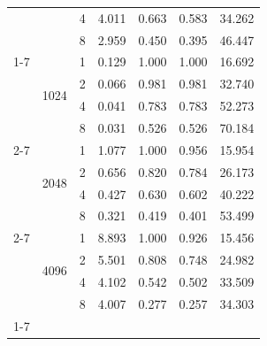 \begin{table}[H]
\begin{tabular}{lllllll}
 &  & 4 & 4.011 & 0.663 & 0.583 & 34.262 \\
 &  & 8 & 2.959 & 0.450 & 0.395 & 46.447 \\
\cline{1-7} \cline{2-7}
\multirow[t]{12}{*}{Alg. 3 Numba (prange)} & \multirow[t]{4}{*}{1024} & 1 & 0.129 & 1.000 & 1.000 & 16.692 \\
 &  & 2 & 0.066 & 0.981 & 0.981 & 32.740 \\
 &  & 4 & 0.041 & 0.783 & 0.783 & 52.273 \\
 &  & 8 & 0.031 & 0.526 & 0.526 & 70.184 \\
\cline{2-7}
 & \multirow[t]{4}{*}{2048} & 1 & 1.077 & 1.000 & 0.956 & 15.954 \\
 &  & 2 & 0.656 & 0.820 & 0.784 & 26.173 \\
 &  & 4 & 0.427 & 0.630 & 0.602 & 40.222 \\
 &  & 8 & 0.321 & 0.419 & 0.401 & 53.499 \\
\cline{2-7}
 & \multirow[t]{4}{*}{4096} & 1 & 8.893 & 1.000 & 0.926 & 15.456 \\
 &  & 2 & 5.501 & 0.808 & 0.748 & 24.982 \\
 &  & 4 & 4.102 & 0.542 & 0.502 & 33.509 \\
 &  & 8 & 4.007 & 0.277 & 0.257 & 34.303 \\
\cline{1-7} \cline{2-7}
\bottomrule
\end{tabular}
\end{table}
